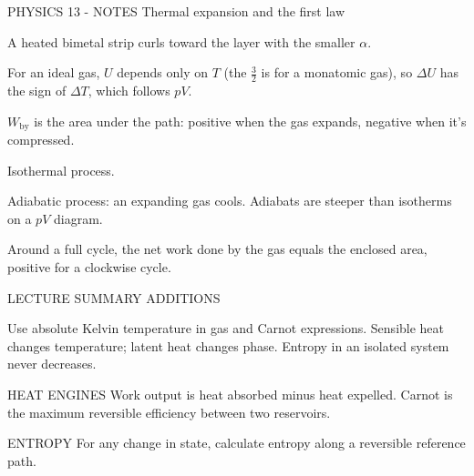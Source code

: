 PHYSICS 13 - NOTES
Thermal expansion and the first law

A heated bimetal strip curls toward the layer with the smaller \(\alpha\).

For an ideal gas, \(U\) depends only on \(T\) (the \(\tfrac32\) is for a monatomic gas), so \(\Delta U\) has the sign of \(\Delta T\), which follows \(pV\).

\(W_{\text{by}}\) is the area under the path: positive when the gas expands, negative when it's compressed.

Isothermal process.

Adiabatic process: an expanding gas cools. Adiabats are steeper than isotherms on a \(pV\) diagram.

Around a full cycle, the net work done by the gas equals the enclosed area, positive for a clockwise cycle.

LECTURE SUMMARY ADDITIONS

Use absolute Kelvin temperature in gas and Carnot expressions. Sensible heat changes temperature; latent heat changes phase. Entropy in an isolated system never decreases.

HEAT ENGINES
Work output is heat absorbed minus heat expelled. Carnot is the maximum reversible efficiency between two reservoirs.

ENTROPY
For any change in state, calculate entropy along a reversible reference path.
